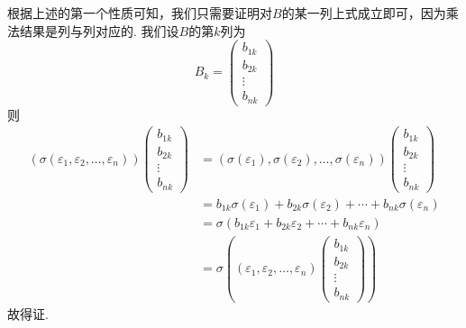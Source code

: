 \begin{enumerate}
          根据上述的第一个性质可知，我们只需要证明对$B$的某一列上式成立即可，因为乘法结果是列与列对应的. 我们设$B$的第$k$列为
          \[B_k=\begin{pmatrix}
                  b_{1k} \\ b_{2k} \\ \vdots \\ b_{nk}
              \end{pmatrix}\]
          则
          \begin{align*}
              (\sigma(\varepsilon_1,\varepsilon_2,\ldots,\varepsilon_n))
              \begin{pmatrix}
                  b_{1k} \\ b_{2k} \\ \vdots \\ b_{nk}
              \end{pmatrix}
               & =(\sigma(\varepsilon_1),\sigma(\varepsilon_2),\ldots,\sigma(\varepsilon_n))\begin{pmatrix}
                                                                                                b_{1k} \\ b_{2k} \\ \vdots \\ b_{nk}
                                                                                            \end{pmatrix} \\
               & =b_{1k}\sigma(\varepsilon_1)+b_{2k}\sigma(\varepsilon_2)+\cdots+b_{nk}\sigma(\varepsilon_n)                    \\
               & =\sigma(b_{1k}\varepsilon_1+b_{2k}\varepsilon_2+\cdots+b_{nk}\varepsilon_n)                                    \\
               & =\sigma((\varepsilon_1,\varepsilon_2,\ldots,\varepsilon_n)
              \begin{pmatrix}
                  b_{1k} \\ b_{2k} \\ \vdots \\ b_{nk}
              \end{pmatrix})
          \end{align*}
          故得证.
\end{enumerate}

